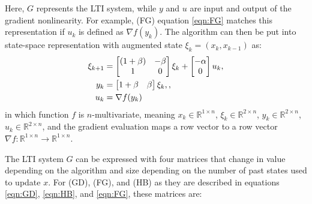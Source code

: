 Here, \(G\) represents the LTI system, while \(y\) and \(u\) are input and output of the gradient nonlinearity. For example, (FG) equation \eqref{eqn:FG} matches this representation if $u_k$ is defined as $\nabla f(y_k)$.
The algorithm can then be put into state-space representation with augmented state $\xi _k = (x_k, x_{k-1})$ as:
\begin{subequations} \label{eqn:FGss }
	\begin{align}
	  \xi_{k+1} &= \begin{bmatrix}(1+\beta) & -\beta\\ 1 & 0\end{bmatrix}\xi_k  + \begin{bmatrix}-\alpha\\ 0\end{bmatrix}u_k \label{eq_FGssstate}, \\
	  y_k &= \begin{bmatrix}1+\beta & \beta\end{bmatrix}\xi_k, \label{eq_FGssinterpolation},\\
	  u_k &= \nabla f(y_k) \label{eq_FGssgradient}
	\end{align}
\end{subequations}
in which function $f$ is $n$-multivariate, meaning  $x_k \in \mathbb{R}^{1\times n}$, $\xi_k \in \mathbb{R}^{2\times n}$, $y_k \in \mathbb{R}^{2\times n}$, $u_k \in \mathbb{R}^{2 \times n}$, and the gradient evaluation maps a row vector to a row vector $\nabla f:\mathbb{R}^{1\times n} \rightarrow \mathbb{R}^{1\times n}$.

The LTI system \(G\) can be expressed with four matrices that change in value depending on the algorithm and size depending on the number of past states used to update \(x\). For (GD), (FG), and (HB) as they are described in equations \eqref{eqn:GD}, \eqref{eqn:HB}, and \eqref{eqn:FG}, these matrices are:

